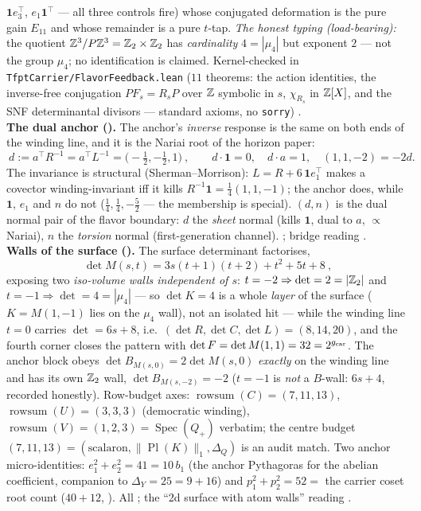 \begin{winbox}
$\mathbf 1 e_3^{\!\top}$, $e_1\mathbf 1^{\!\top}$ --- all three controls fire) whose conjugated
deformation is the pure gain $E_{11}$ and whose remainder is a pure $t$-tap.  \emph{The honest typing
(load-bearing):} the quotient $\mathbb{Z}^3/P\mathbb{Z}^3 = \mathbb{Z}_2\times\mathbb{Z}_2$ has \emph{cardinality} $4 = |\mu_4|$ but
exponent $2$ --- not the group $\mu_4$; no identification is claimed.  Kernel-checked in
\texttt{TfptCarrier/FlavorFeedback.lean} ($11$ theorems: the action identities, the inverse-free
conjugation $P F_s = R_s P$ over $\mathbb{Z}$ symbolic in $s$, $\chi_{R_s}$ in $\mathbb{Z}[X]$, and the SNF
determinantal divisors --- standard axioms, no \texttt{sorry}) \mE.
\smallskip\\
\noindent\textbf{The dual anchor ().} The anchor's \emph{inverse} response is the
same on both ends of the winding line, and it is the Nariai root of the horizon paper:
\[
  \boxed{\ d:=a^\top R^{-1}=a^\top L^{-1}=\bigl(-\tfrac12,-\tfrac12,1\bigr)\ },\qquad
  d\cdot\mathbf 1=0,\quad d\cdot a=1,\quad (1,1,-2)=-2d .
\]
The invariance is structural (Sherman--Morrison): $L=R+6\,\mathbf 1e_1^\top$ makes a covector
winding-invariant iff it kills $R^{-1}\mathbf 1=\tfrac14(1,1,-1)$; the anchor does, while $\mathbf 1$,
$e_1$ and $n$ do not ($\tfrac14,\tfrac14,-\tfrac52$ --- the membership is special). $(d,n)$ is the dual
normal pair of the flavor boundary: $d$ the \emph{sheet} normal (kills $\mathbf 1$, dual to $a$,
$\propto$ Nariai), $n$ the \emph{torsion} normal (first-generation channel). \mE; bridge reading \mC.
\smallskip\\
\noindent\textbf{Walls of the surface ().} The surface determinant factorises,
\[
  \boxed{\ \det M(s,t)=3s(t{+}1)(t{+}2)+t^2+5t+8\ },
\]
exposing two \emph{iso-volume walls independent of $s$}: $t=-2\Rightarrow\det=2=|\mathbb{Z}_2|$ and
$t=-1\Rightarrow\det=4=|\mu_4|$ --- so $\det K=4$ is a whole \emph{layer} of the surface ($K=M(1,-1)$ lies
on the $\mu_4$ wall), not an isolated hit --- while the winding line $t=0$ carries $\det=6s+8$, i.e.\
$(\det R,\det C,\det L)=(8,14,20)$, and the fourth corner closes the pattern with
$\det F=\det M(1,1)=32=2^{g_{\mathrm{car}}}$. The anchor block obeys $\det B_{M(s,0)}=2\det M(s,0)$ \emph{exactly} on
the winding line and has its own $\mathbb{Z}_2$ wall, $\det B_{M(s,-2)}=-2$ ($t=-1$ is \emph{not} a $B$-wall:
$6s+4$, recorded honestly). Row-budget axes: $\operatorname{rowsum}(C)=(7,11,13)$,
$\operatorname{rowsum}(U)=(3,3,3)$ (democratic winding), $\operatorname{rowsum}(V)=(1,2,3)=
\operatorname{Spec}(Q_+)$ verbatim; the centre budget $(7,11,13)=(\text{scalaron},\|\operatorname{Pl}(K)\|_1,
\Delta_Q)$ is an audit match. Two anchor micro-identities: $e_1^2+e_2^2=41=10\,b_1$ (the anchor Pythagoras
for the abelian coefficient, companion to $\Delta_Y=25=9{+}16$) and $p_1^2+p_2^2=52=$ the carrier coset
root count ($40{+}12$, \veri{v128\_graded\_hull.py}). All \mE; the ``2d surface with atom walls'' reading \mC.
\end{winbox}
